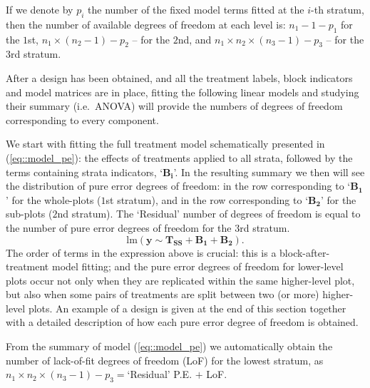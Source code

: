 If we denote by $p_i$ the number of the fixed model terms fitted at the $i$-th stratum, then the number of available degrees of freedom at each level is: $n_1-1-p_1$ for the $1$st, $n_1\times(n_2-1)-p_2$ -- for the $2$nd, and $n_1\times n_2\times(n_3-1)-p_3$ -- for the $3$rd stratum.

After a design has been obtained, and all the treatment labels, block indicators and model matrices are in place, fitting the following linear models and studying their summary (i.e.~ANOVA) will provide the numbers of degrees of freedom corresponding to every component. 

We start with fitting the full treatment model schematically presented in (\ref{eq::model_pe}): the effects of treatments applied to all strata, followed by the terms containing strata indicators, `$\bm{B_i}$'. In the resulting summary we then will see the distribution of pure error degrees of freedom: in the row corresponding to `$\bm{B_1}$' for the whole-plots ($1$st stratum), and in the row corresponding to `$\bm{B_2}$' for the sub-plots ($2$nd stratum). The `Residual' number of degrees of freedom is equal to the number of pure error degrees of freedom for the $3$rd stratum.
\begin{equation}
\label{eq::model_pe}
\mathrm{lm}(\bm{y}\sim\bm{T_{SS}}+\bm{B_1}+\bm{B_2}).
\end{equation}
The order of terms in the expression above is crucial: this is a block-after-treatment model fitting; and the pure error degrees of freedom for lower-level plots occur not only when they are replicated within the same higher-level plot, but also when some pairs of treatments are split between two (or more) higher-level plots. An example of a design is given at the end of this section together with a detailed description of how each pure error degree of freedom is obtained.

From the summary of model (\ref{eq::model_pe}) we automatically obtain the number of lack-of-fit degrees of freedom (LoF) for the lowest stratum, as $n_1\times n_2\times(n_3-1)-p_3 = $`Residual' P.E. $+$ LoF.

